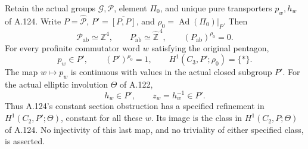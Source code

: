 Retain the actual groups \(\mathcal G,\mathcal P\), element
\(\Pi_0\), and unique pure transporters \(p_w,h_w\) of A.124.
Write \(P=\widehat{\mathcal P}\), \(P'=\overline{[P,P]}\), and
\(\rho_0=\operatorname{Ad}(\Pi_0)|_P\). Then
\[
 \mathcal P_{\mathrm{ab}}\simeq\mathbb Z^4,\qquad
 P_{\mathrm{ab}}\simeq\widehat{\mathbb Z}^{\,4},\qquad
 (P_{\mathrm{ab}})^{\rho_0}=0.                               \tag{A.125.1}
\]
For every profinite commutator word \(w\) satisfying the original
pentagon,
\[
 p_w\in P',\qquad
 (P')^{\rho_0}=1,\qquad H^1(C_3,P';\rho_0)=\{*\}.              \tag{A.125.2}
\]
The map \(w\mapsto p_w\) is continuous with values in the actual
closed subgroup \(P'\).
For the actual elliptic involution \(\Theta\) of A.122,
\[
 h_w\in P',\qquad z_w=h_w^{-1}\in P'.                         \tag{A.125.3}
\]
Thus A.124's constant section obstruction has a specified refinement
in \(H^1(C_2,P';\Theta)\), constant for all these \(w\).
Its image is the class in \(H^1(C_2,P;\Theta)\) of A.124.
No injectivity of this last map, and no triviality of either
specified class, is asserted.

